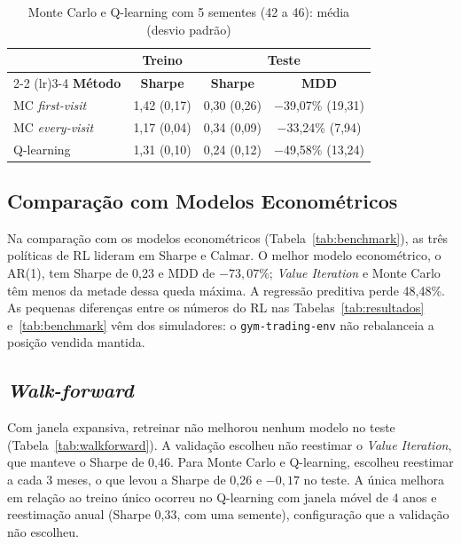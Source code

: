 \documentclass[conference]{IEEEtran}
\begin{document}
\begin{table}[!t]
  \centering
  \caption{Monte Carlo e Q-learning com 5 sementes (42 a 46): média (desvio padrão)}
  \label{tab:sementes}
  \footnotesize
  \setlength{\tabcolsep}{4pt}
  \renewcommand{\arraystretch}{1.1}
  \begin{tabular}{l ccc}
    \toprule
    & \textbf{Treino} & \multicolumn{2}{c}{\textbf{Teste}} \\
    \cmidrule(lr){2-2} \cmidrule(lr){3-4}
    \textbf{Método} & \textbf{Sharpe} & \textbf{Sharpe} & \textbf{MDD} \\
    \midrule
    MC \textit{first-visit}  & 1,42 (0,17) & 0,30 (0,26) & $-$39,07\% (19,31) \\
    MC \textit{every-visit}  & 1,17 (0,04) & 0,34 (0,09) & $-$33,24\% (7,94)  \\
    Q-learning               & 1,31 (0,10) & 0,24 (0,12) & $-$49,58\% (13,24) \\
    \bottomrule
  \end{tabular}
\end{table}

\subsection{Comparação com Modelos Econométricos}

Na comparação com os modelos econométricos (Tabela~\ref{tab:benchmark}), as três políticas de RL lideram em Sharpe e Calmar. O melhor modelo econométrico, o AR(1), tem Sharpe de 0,23 e MDD de $-73{,}07\%$; \textit{Value Iteration} e Monte Carlo têm menos da metade dessa queda máxima. A regressão preditiva perde 48,48\%. As pequenas diferenças entre os números do RL nas Tabelas~\ref{tab:resultados} e~\ref{tab:benchmark} vêm dos simuladores: o \texttt{gym-trading-env} não rebalanceia a posição vendida mantida.

\subsection{\textit{Walk-forward}}

Com janela expansiva, retreinar não melhorou nenhum modelo no teste (Tabela~\ref{tab:walkforward}). A validação escolheu não reestimar o \textit{Value Iteration}, que manteve o Sharpe de 0,46. Para Monte Carlo e Q-learning, escolheu reestimar a cada 3 meses, o que levou a Sharpe de 0,26 e $-0{,}17$ no teste. A única melhora em relação ao treino único ocorreu no Q-learning com janela móvel de 4 anos e reestimação anual (Sharpe 0,33, com uma semente), configuração que a validação não escolheu.
\end{document}
